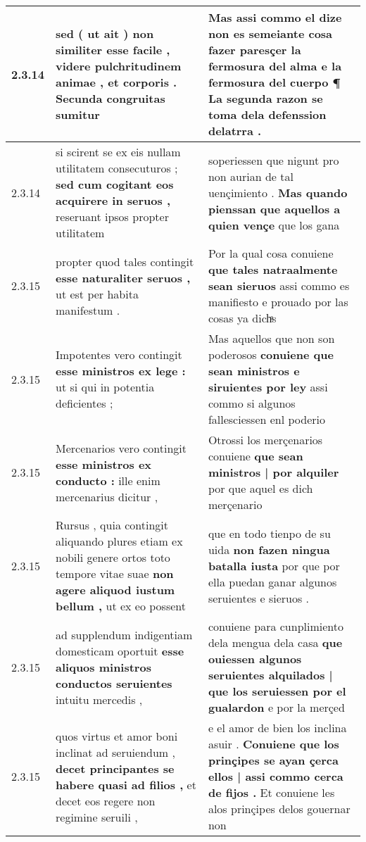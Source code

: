 \begin{tabular}{|p{1cm}|p{6.5cm}|p{6.5cm}|}
2.3.14 & sed ( ut ait ) non similiter esse facile , \textbf{ videre pulchritudinem animae , et corporis . } Secunda congruitas sumitur & Mas assi commo el dize non es semeiante cosa fazer paresçer la fermosura del alma \textbf{ e la fermosura del cuerpo ¶ } La segunda razon se toma dela defenssion delatrra . \\\hline
2.3.14 & si scirent se ex eis nullam utilitatem consecuturos ; \textbf{ sed cum cogitant eos acquirere in seruos , } reseruant ipsos propter utilitatem & soperiessen que nigunt pro non aurian de tal uençimiento . \textbf{ Mas quando pienssan que aquellos a quien vençe } que los gana \\\hline
2.3.15 & propter quod tales contingit \textbf{ esse naturaliter seruos , } ut est per habita manifestum . & Por la qual cosa conuiene \textbf{ que tales natraalmente sean sieruos } assi commo es manifiesto e prouado por las cosas ya dichͣs \\\hline
2.3.15 & Impotentes vero contingit \textbf{ esse ministros ex lege : } ut si qui in potentia deficientes ; & Mas aquellos que non son poderosos \textbf{ conuiene que sean ministros e siruientes por ley } assi commo si algunos fallesciessen enl poderio \\\hline
2.3.15 & Mercenarios vero contingit \textbf{ esse ministros ex conducto : } ille enim mercenarius dicitur , & Otrossi los merçenarios conuiene \textbf{ que sean ministros | por alquiler } por que aquel es dich merçenario \\\hline
2.3.15 & Rursus , quia contingit aliquando plures etiam ex nobili genere ortos toto tempore vitae suae \textbf{ non agere aliquod iustum bellum , } ut ex eo possent & que en todo tienpo de su uida \textbf{ non fazen ningua batalla iusta } por que por ella puedan ganar algunos seruientes e sieruos . \\\hline
2.3.15 & ad supplendum indigentiam domesticam oportuit \textbf{ esse aliquos ministros conductos seruientes } intuitu mercedis , & conuiene para cunplimiento dela mengua dela casa \textbf{ que ouiessen algunos seruientes alquilados | que los seruiessen por el gualardon } e por la merçed \\\hline
2.3.15 & quos virtus et amor boni inclinat ad seruiendum , \textbf{ decet principantes se habere quasi ad filios , } et decet eos regere non regimine seruili , & e el amor de bien los inclina asuir . \textbf{ Conuiene que los prinçipes se ayan çerca ellos | assi commo cerca de fijos . } Et conuiene les alos prinçipes delos gouernar non \\\hline

\end{tabular}
